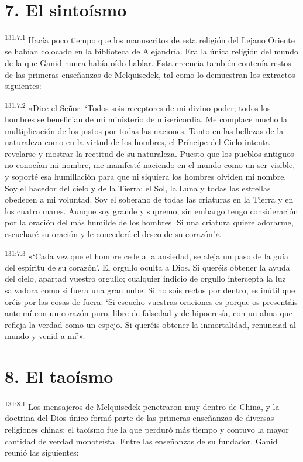 \section*{7. El sintoísmo}
\par
\textsuperscript{131:7.1} Hacía poco tiempo que los manuscritos de esta religión del Lejano Oriente se habían colocado en la biblioteca de Alejandría. Era la única religión del mundo de la que Ganid nunca había oído hablar. Esta creencia también contenía restos de las primeras enseñanzas de Melquisedek, tal como lo demuestran los extractos siguientes:

\par
\textsuperscript{131:7.2} «Dice el Señor: `Todos sois receptores de mi divino poder; todos los hombres se benefician de mi ministerio de misericordia. Me complace mucho la multiplicación de los justos por todas las naciones. Tanto en las bellezas de la naturaleza como en la virtud de los hombres, el Príncipe del Cielo intenta revelarse y mostrar la rectitud de su naturaleza. Puesto que los pueblos antiguos no conocían mi nombre, me manifesté naciendo en el mundo como un ser visible, y soporté esa humillación para que ni siquiera los hombres olviden mi nombre. Soy el hacedor del cielo y de la Tierra; el Sol, la Luna y todas las estrellas obedecen a mi voluntad. Soy el soberano de todas las criaturas en la Tierra y en los cuatro mares. Aunque soy grande y supremo, sin embargo tengo consideración por la oración del más humilde de los hombres. Si una criatura quiere adorarme, escucharé su oración y le concederé el deseo de su corazón'».

\par
\textsuperscript{131:7.3} «`Cada vez que el hombre cede a la ansiedad, se aleja un paso de la guía del espíritu de su corazón'. El orgullo oculta a Dios. Si queréis obtener la ayuda del cielo, apartad vuestro orgullo; cualquier indicio de orgullo intercepta la luz salvadora como si fuera una gran nube. Si no sois rectos por dentro, es inútil que oréis por las cosas de fuera. `Si escucho vuestras oraciones es porque os presentáis ante mí con un corazón puro, libre de falsedad y de hipocresía, con un alma que refleja la verdad como un espejo. Si queréis obtener la inmortalidad, renunciad al mundo y venid a mí'».

\section*{8. El taoísmo}
\par
\textsuperscript{131:8.1} Los mensajeros de Melquisedek penetraron muy dentro de China, y la doctrina del Dios único formó parte de las primeras enseñanzas de diversas religiones chinas; el taoísmo fue la que perduró más tiempo y contuvo la mayor cantidad de verdad monoteísta. Entre las enseñanzas de su fundador, Ganid reunió las siguientes:

